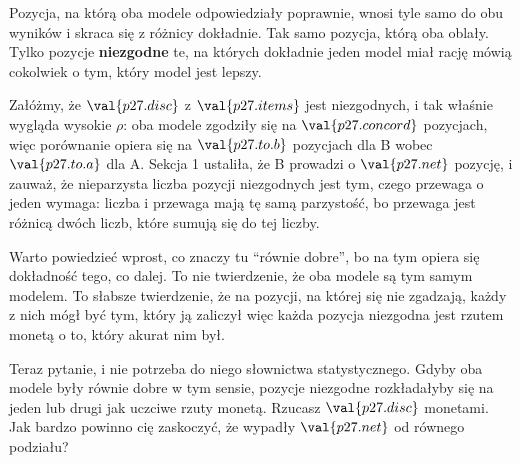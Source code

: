 \begin{fr}

Pozycja, na którą oba modele odpowiedziały poprawnie, wnosi tyle samo do obu
wyników i skraca się z różnicy dokładnie. Tak samo pozycja, którą oba oblały.
Tylko pozycje \textbf{niezgodne} \dash{} te, na których dokładnie jeden model
miał rację \dash{} mówią cokolwiek o tym, który model jest lepszy.

Załóżmy, że $\val{p27.disc}$ z $\val{p27.items}$ jest niezgodnych, i tak
właśnie wygląda wysokie $\rho$: oba modele zgodziły się na
$\val{p27.concord}$ pozycjach, więc porównanie opiera się na
$\val{p27.to.b}$ pozycjach dla B wobec $\val{p27.to.a}$ dla A. Sekcja 1
ustaliła, że B prowadzi o $\val{p27.net}$ pozycję, i zauważ, że nieparzysta
liczba pozycji niezgodnych jest tym, czego przewaga o jeden wymaga: liczba i
przewaga mają tę samą parzystość, bo przewaga jest różnicą dwóch liczb, które
sumują się do tej liczby.

Warto powiedzieć wprost, co znaczy tu \enquote{równie dobre}, bo na tym
opiera się dokładność tego, co dalej. To nie twierdzenie, że oba modele są tym
samym modelem. To słabsze twierdzenie, że na pozycji, na której się nie
zgadzają, każdy z nich mógł być tym, który ją zaliczył \dash{} więc każda
pozycja niezgodna jest rzutem monetą o to, który akurat nim był.

Teraz pytanie, i nie potrzeba do niego słownictwa statystycznego. Gdyby oba
modele były równie dobre w tym sensie, pozycje niezgodne rozkładałyby się na
jeden lub drugi jak uczciwe rzuty monetą. Rzucasz $\val{p27.disc}$ monetami.
Jak bardzo powinno cię zaskoczyć, że wypadły $\val{p27.net}$ od równego
podziału?
\dotline
\nextframe
\end{fr}

